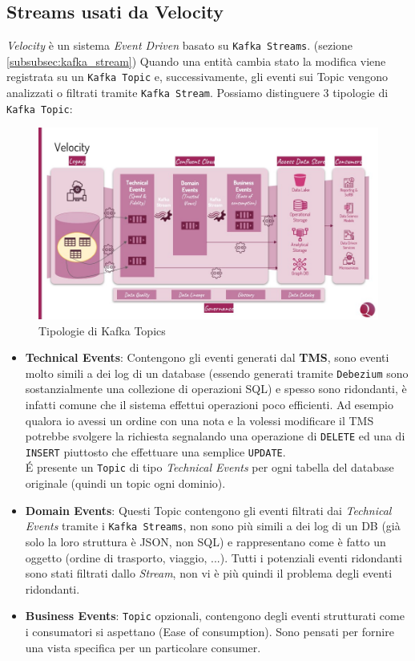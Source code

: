\subsection{Streams usati da Velocity}
\label{sec:velocity_streams}
\textit{Velocity} è un sistema \textit{Event Driven} basato su \texttt{Kafka Streams}. (sezione \ref{subsubsec:kafka_stream})
Quando una entità cambia stato la modifica viene registrata su un \texttt{Kafka Topic} e, successivamente, gli eventi sui Topic vengono analizzati o filtrati tramite \texttt{Kafka Stream}.
Possiamo distinguere 3 tipologie di \texttt{Kafka Topic}:
\begin{figure}[H]
    \centering
    \includegraphics[scale=0.5]{images/architecture/confluent_velocity.jpg}
    \caption{Tipologie di Kafka Topics}
    \label{fig:kafka_topics.img}
\end{figure}
\begin{itemize}
    \item \textbf{Technical Events}: Contengono gli eventi generati dal \textbf{TMS}, sono eventi molto simili a dei log di un database
    (essendo generati tramite \texttt{Debezium} sono sostanzialmente una collezione di operazioni SQL) e spesso sono ridondanti, è
    infatti comune che il sistema effettui operazioni poco efficienti.
    Ad esempio qualora io avessi un ordine con una nota e la volessi modificare il TMS potrebbe svolgere la richiesta segnalando una operazione di \texttt{DELETE} ed una di \texttt{INSERT} piuttosto che effettuare una semplice \texttt{UPDATE}.\\
    É presente un \texttt{Topic} di tipo \textit{Technical Events} per ogni tabella del database originale (quindi un topic ogni dominio).
    \item \textbf{Domain Events}: Questi Topic contengono gli eventi filtrati dai \textit{Technical Events} tramite i \texttt{Kafka Streams}, non sono più simili a dei log di un DB (già solo la loro struttura è JSON, non SQL) e rappresentano come è fatto un oggetto (ordine di trasporto, viaggio, ...). 
    Tutti i potenziali eventi ridondanti sono stati filtrati dallo \textit{Stream}, non vi è più quindi il problema degli eventi ridondanti.
    \item \textbf{Business Events}: \texttt{Topic} opzionali, contengono degli eventi strutturati come i consumatori si aspettano (Ease of consumption). Sono pensati per fornire una vista specifica per un particolare consumer.
\end{itemize}

